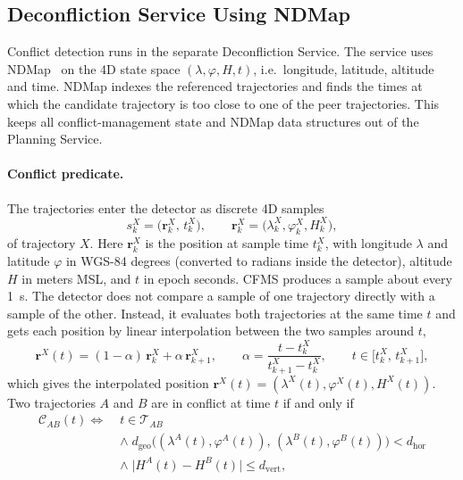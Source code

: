 \subsection{Deconfliction Service Using NDMap}
\label{sec:conflict_detection}

Conflict detection runs in the separate Deconfliction Service. The service uses NDMap~\cite{NDMap} on the 4D state space \((\lambda,\varphi,H,t)\), i.e.\ longitude, latitude, altitude and time. NDMap indexes the referenced trajectories and finds the times at which the candidate trajectory is too close to one of the peer trajectories. This keeps all conflict-management state and NDMap data structures out of the Planning Service.

\paragraph{Conflict predicate.}
The trajectories enter the detector as discrete 4D samples
\[
s^{X}_{k} = \bigl(\mathbf{r}^{X}_{k},\, t^{X}_{k}\bigr),
\qquad
\mathbf{r}^{X}_{k} = \bigl(\lambda^{X}_{k}, \varphi^{X}_{k}, H^{X}_{k}\bigr),
\]
of trajectory \(X\). Here \(\mathbf{r}^{X}_{k}\) is the position at sample time \(t^{X}_{k}\), with longitude \(\lambda\) and latitude \(\varphi\) in WGS-84 degrees (converted to radians inside the detector), altitude \(H\) in meters MSL, and \(t\) in epoch seconds. CFMS produces a sample about every \SI{1}{s}. The detector does not compare a sample of one trajectory directly with a sample of the other. Instead, it evaluates both trajectories at the same time \(t\) and gets each position by linear interpolation between the two samples around \(t\),
\begin{equation}
\label{eq:traj_interpolation}
\mathbf{r}^{X}(t) = (1-\alpha)\,\mathbf{r}^{X}_{k} + \alpha\,\mathbf{r}^{X}_{k+1},
\qquad
\alpha = \frac{t - t^{X}_{k}}{t^{X}_{k+1} - t^{X}_{k}},
\qquad
t \in \bigl[t^{X}_{k},\, t^{X}_{k+1}\bigr],
\end{equation}
which gives the interpolated position \(\mathbf{r}^{X}(t) = (\lambda^{X}(t), \varphi^{X}(t), H^{X}(t))\). Two trajectories \(A\) and \(B\) are in conflict at time \(t\) if and only if
\begin{equation}
\label{eq:conflict_predicate}
\begin{aligned}
\mathcal{C}_{AB}(t) \iff\;
  & t \in \mathcal{T}_{AB} \\
  &\wedge\; d_{\mathrm{geo}}\bigl((\lambda^{A}(t), \varphi^{A}(t)),\,
      (\lambda^{B}(t), \varphi^{B}(t))\bigr) < d_{\mathrm{hor}} \\
  &\wedge\; \bigl\lvert H^{A}(t) - H^{B}(t) \bigr\rvert \le d_{\mathrm{vert}},
\end{aligned}
\end{equation}
